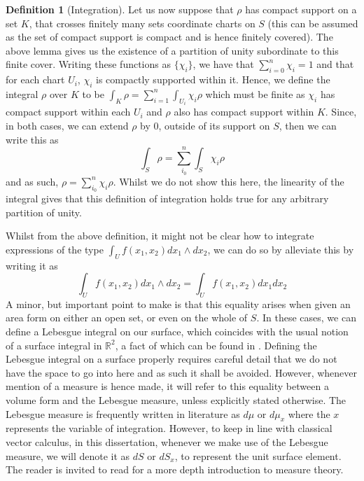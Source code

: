 \documentclass[11pt]{report}
\theoremstyle{definition}
\newtheorem{defn}[thm]{Definition}
\begin{document}
\begin{defn}[Integration]
  Let us now suppose that $\rho$ has compact support on a set $K$, that crosses finitely many sets coordinate charts on $S$ (this can be assumed as the set of compact support is compact and is hence finitely covered). The above lemma gives us the existence of a partition of unity subordinate to this finite cover. Writing these functions as $\{\chi_i\}$, we have that $\sum\limits_{i = 0}^n \chi_i = 1$ and that for each chart $U_i$, $\chi_i$ is compactly supported within it. Hence, we define the integral $\rho$ over $K$ to be $\int_K \rho = \sum\limits_{i=1}^n\int_{U_i}\chi_i\rho$ which must be finite as $\chi_i$ has compact support within each $U_i$ and $\rho$ also has compact support within $K$. Since, in both cases, we can extend $\rho$ by 0, outside of its support on $S$, then we can write this as 
  \[\int_S \rho = \sum\limits_{i_0}^n\int_S\chi_i\rho\]
  and as such, $\rho = \sum\limits_{i_0}^n\chi_i\rho$. Whilst we do not show this here, the linearity of the integral gives that this definition of integration holds true for any arbitrary partition of unity.
\end{defn}

Whilst from the above definition, it might not be clear how to integrate expressions of the type $\int_U f(x_1,x_2)dx_1\wedge dx_2$, we can do so by alleviate this by writing it as 
\[\int_U f(x_1,x_2)dx_1\wedge dx_2 = \int_U f(x_1,x_2)dx_1dx_2\]
A minor, but important point to make is that this equality arises when given an area form on either an open set, or even on the whole of $S$. In these cases, we can define a Lebesgue integral on our surface, which coincides with the usual notion of a surface integral in $\mathbb{R}^2$, a fact of which can be found in \cite[Chapter 4]{spivak}. Defining the Lebesgue integral on a surface properly requires careful detail that we do not have the space to go into here and as such it shall be avoided. However, whenever mention of a measure is hence made, it will refer to this equality between a volume form and the Lebesgue measure, unless explicitly stated otherwise. The Lebesgue measure is frequently written in literature as $d\mu$ or $d\mu_x$ where the $x$ represents the variable of integration. However, to keep in line with classical vector calculus, in this dissertation, whenever we make use of the Lebesgue measure, we will denote it as $dS$ or $dS_x$, to represent the unit surface element. The reader is invited to read \cite[Chapter 11]{babyRudin} for a more depth introduction to measure theory.
\end{document}
